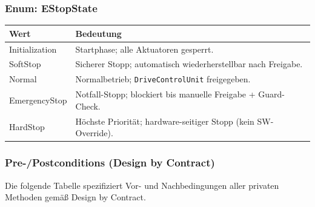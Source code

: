 \subsubsection{Enum: EStopState}

\begin{center}
\renewcommand{\arraystretch}{1.2}
\begin{tabular}{>{\ttfamily}p{4cm} p{9cm}}
  \toprule
  \normalfont\textbf{Wert} & \normalfont\textbf{Bedeutung} \\
  \midrule
  Initialization & Startphase; alle Aktuatoren gesperrt. \\
  SoftStop       & Sicherer Stopp; automatisch wiederherstellbar nach Freigabe. \\
  Normal         & Normalbetrieb; \texttt{DriveControlUnit} freigegeben. \\
  EmergencyStop  & Notfall-Stopp; blockiert bis manuelle Freigabe + Guard-Check. \\
  HardStop       & Höchste Priorität; hardware-seitiger Stopp (kein SW-Override). \\
  \bottomrule
\end{tabular}
\end{center}

\subsubsection{Pre-/Postconditions (Design by Contract)}

Die folgende Tabelle spezifiziert Vor- und Nachbedingungen aller privaten Methoden
gemäß Design by Contract.

